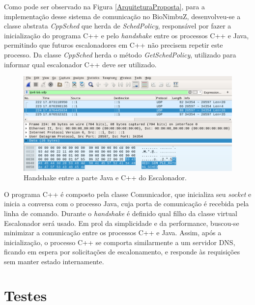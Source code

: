 

Como pode ser observado na Figura \ref{ArquiteturaProposta}, para a implementação desse sistema de comunicação no BioNimbuZ, desenvolveu-se a classe abstrata \textit{CppSched} que herda de \textit{SchedPolicy}, responsável por fazer a inicialização do programa C++ e pelo \textit{handshake} entre os processos C++ e Java, permitindo que futuros escalonadores em C++ não precisem repetir este processo. Da classe \textit{CppSched} herda o método \textit{GetSchedPolicy}, utilizado para informar qual escalonador C++ deve ser utilizado.

\begin{figure}[htbp]
	\centerline{\includegraphics[width=13cm]{img/Handshake3.png}}
	\caption{Handshake entre a parte Java e C++ do Escalonador.}
	\label{Handshake}
\end{figure}

O programa C++ é composto pela classe Comunicador, que inicializa seu \textit{socket} e inicia a conversa com o processo Java, cuja porta de comunicação é recebida pela linha de comando. Durante o \textit{handshake} é definido qual filho da classe virtual Escalonador será usado. Em prol da simplicidade e da performance, buscou-se minimizar a comunicação entre os processos C++ e Java. Assim, após a inicialização, o processo C++ se comporta similarmente a um servidor \acrshort{DNS}\cite{dns_rfc}, ficando em espera por solicitações de escalonamento, e responde às requisições sem manter estado internamente.

\section{Testes}


